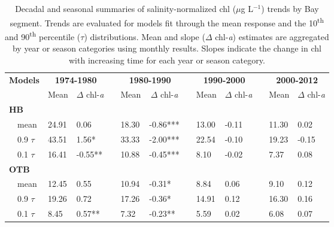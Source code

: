 \documentclass{svjour3}\usepackage[]{graphicx}\usepackage[]{color}
\newcommand{\mugl}{$\mu$g L$^{-1}$}
\begin{document}
%
\begin{table}[!tbp]
\caption{Decadal and seasonal summaries of salinity-normalized \ac{chl} (\mugl) trends by Bay segment. Trends are evaluated for models fit through the mean response and the 10\textsuperscript{th} and 90\textsuperscript{th} percentile ($\tau$) distributions.  Mean and slope ($\Delta$ chl-\textit{a}) estimates are aggregated by year or season categories using monthly results.  Slopes indicate the change in \ac{chl} with increasing time for each year or season category.\label{tab:trendsal}} 
\begin{center}
\begin{tabular}{lllcllcllcll}
\hline\hline
\multicolumn{1}{l}{\bfseries Models}&\multicolumn{2}{c}{\bfseries {\bf 1974-1980}}&\multicolumn{1}{c}{\bfseries }&\multicolumn{2}{c}{\bfseries {\bf 1980-1990}}&\multicolumn{1}{c}{\bfseries }&\multicolumn{2}{c}{\bfseries {\bf 1990-2000}}&\multicolumn{1}{c}{\bfseries }&\multicolumn{2}{c}{\bfseries {\bf 2000-2012}}\tabularnewline
\cline{2-3} \cline{5-6} \cline{8-9} \cline{11-12}
\multicolumn{1}{l}{}&\multicolumn{1}{c}{Mean}&\multicolumn{1}{c}{$\Delta$ chl-\textit{a}}&\multicolumn{1}{c}{}&\multicolumn{1}{c}{Mean}&\multicolumn{1}{c}{$\Delta$ chl-\textit{a}}&\multicolumn{1}{c}{}&\multicolumn{1}{c}{Mean}&\multicolumn{1}{c}{$\Delta$ chl-\textit{a}}&\multicolumn{1}{c}{}&\multicolumn{1}{c}{Mean}&\multicolumn{1}{c}{$\Delta$ chl-\textit{a}}\tabularnewline
\hline
{\bfseries HB}&&&&&&&&&&&\tabularnewline
~~mean&24.91& 0.06 &&18.30&-0.86***&&13.00&-0.11 &&11.30& 0.02 \tabularnewline
~~0.9 $\tau$&43.51& 1.56*&&33.33&-2.00***&&22.54&-0.10 &&19.23&-0.15 \tabularnewline
~~0.1 $\tau$&16.41&-0.55**&&10.88&-0.45***&& 8.10&-0.02 && 7.37& 0.08 \tabularnewline
\hline
{\bfseries OTB}&&&&&&&&&&&\tabularnewline
~~mean&12.45& 0.55 &&10.94&-0.31*&& 8.84& 0.06 && 9.10& 0.12 \tabularnewline
~~0.9 $\tau$&19.26& 0.72 &&17.26&-0.36*&&14.91& 0.12 &&16.30& 0.16 \tabularnewline
~~0.1 $\tau$& 8.45& 0.57**&& 7.32&-0.23**&& 5.59& 0.02 && 6.08& 0.07 \tabularnewline

\end{tabular}
\end{center}
\end{table}
\end{document}
